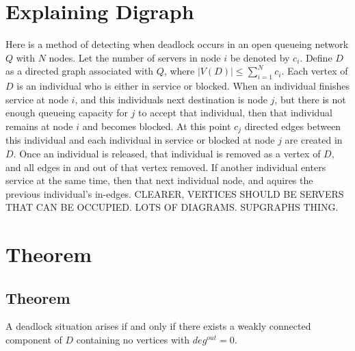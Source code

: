 \documentclass{article}
\begin{document}
\section{Explaining Digraph}
Here is a method of detecting when deadlock occurs in an open queueing network $Q$ with $N$ nodes.
Let the number of servers in node $i$ be denoted by $c_i$.\newline
Define $D$ as a directed graph associated with $Q$, where $\left| V(D) \right| \leq \sum_{i=1}^N c_i$. Each vertex of $D$ is an individual who is either in service or blocked.\newline
When an individual finishes service at node $i$, and this individuals next destination is node $j$, but there is not enough queueing capacity for $j$ to accept that individual, then that individual remains at node $i$ and becomes blocked.
At this point $c_j$ directed edges between this individual and each individual in service or blocked at node $j$ are created in $D$.\newline
Once an individual is released, that individual is removed as a vertex of $D$, and all edges in and out of that vertex removed.
If another individual enters service at the same time, then that next individual node, and aquires the previous individual's in-edges.\newline
CLEARER, VERTICES SHOULD BE SERVERS THAT CAN BE OCCUPIED. LOTS OF DIAGRAMS. SUPGRAPHS THING.

\section{Theorem}

\subsection*{Theorem}
A deadlock situation arises if and only if there exists a weakly connected component of $D$ containing no vertices with $deg^{out} = 0$.\newline
\end{document}

